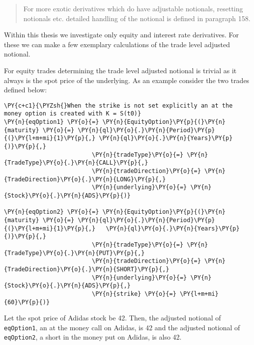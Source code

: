 \begin{quote}
For more exotic derivatives which do have adjustable notionals,
resetting notionals etc. detailed handling of the notional is defined in
paragraph 158.
\end{quote}

    Within this thesis we investigate only equity and interest rate
derivatives. For these we can make a few exemplary calculations of the
trade level adjusted notional.

For equity trades determining the trade level adjusted notional is
trivial as it always is the spot price of the underlying. As an example
consider the two trades defined below:

    \begin{tcolorbox}[breakable, size=fbox, boxrule=1pt, pad at break*=1mm,colback=cellbackground, colframe=cellborder]
\begin{Verbatim}[commandchars=\\\{\}]
\PY{c+c1}{\PYZsh{}When the strike is not set explicitly an at the money option is created with K = S(t0)}
\PY{n}{eqOption1} \PY{o}{=} \PY{n}{EquityOption}\PY{p}{(}\PY{n}{maturity} \PY{o}{=} \PY{n}{ql}\PY{o}{.}\PY{n}{Period}\PY{p}{(}\PY{l+m+mi}{1}\PY{p}{,} \PY{n}{ql}\PY{o}{.}\PY{n}{Years}\PY{p}{)}\PY{p}{,}
                         \PY{n}{tradeType}\PY{o}{=} \PY{n}{TradeType}\PY{o}{.}\PY{n}{CALL}\PY{p}{,}
                         \PY{n}{tradeDirection}\PY{o}{=} \PY{n}{TradeDirection}\PY{o}{.}\PY{n}{LONG}\PY{p}{,}
                         \PY{n}{underlying}\PY{o}{=} \PY{n}{Stock}\PY{o}{.}\PY{n}{ADS}\PY{p}{)}

\PY{n}{eqOption2} \PY{o}{=} \PY{n}{EquityOption}\PY{p}{(}\PY{n}{maturity} \PY{o}{=} \PY{n}{ql}\PY{o}{.}\PY{n}{Period}\PY{p}{(}\PY{l+m+mi}{1}\PY{p}{,}   \PY{n}{ql}\PY{o}{.}\PY{n}{Years}\PY{p}{)}\PY{p}{,}
                         \PY{n}{tradeType}\PY{o}{=} \PY{n}{TradeType}\PY{o}{.}\PY{n}{PUT}\PY{p}{,}
                         \PY{n}{tradeDirection}\PY{o}{=} \PY{n}{TradeDirection}\PY{o}{.}\PY{n}{SHORT}\PY{p}{,}
                         \PY{n}{underlying}\PY{o}{=} \PY{n}{Stock}\PY{o}{.}\PY{n}{ADS}\PY{p}{,}
                         \PY{n}{strike} \PY{o}{=} \PY{l+m+mi}{60}\PY{p}{)}
\end{Verbatim}
\end{tcolorbox}

    Let the spot price of Adidas stock be 42. Then, the adjusted notional of
\texttt{eqOption1}, an at the money call on Adidas, is 42 and the
adjusted notional of \texttt{eqOption2}, a short in the money put on
Adidas, is also 42.


